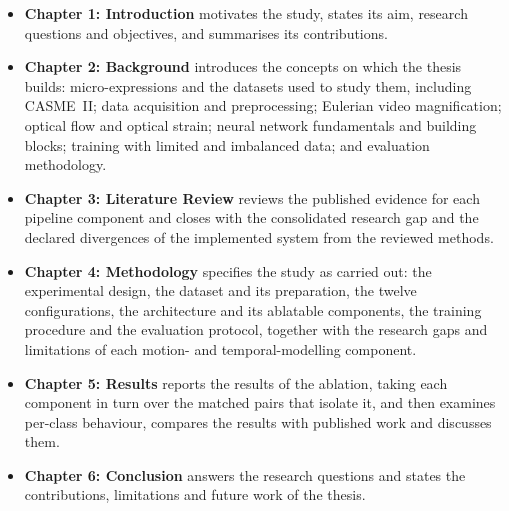 \begin{itemize}
	\item \textbf{Chapter 1: Introduction} motivates the study, states its aim, research questions and objectives, and summarises its contributions.

	\item \textbf{Chapter 2: Background} introduces the concepts on which the thesis builds: micro-expressions and the datasets used to study them, including CASME~II; data acquisition and preprocessing; Eulerian video magnification; optical flow and optical strain; neural network fundamentals and building blocks; training with limited and imbalanced data; and evaluation methodology.

	\item \textbf{Chapter 3: Literature Review} reviews the published evidence for each pipeline component and closes with the consolidated research gap and the declared divergences of the implemented system from the reviewed methods.

	\item \textbf{Chapter 4: Methodology} specifies the study as carried out: the experimental design, the dataset and its preparation, the twelve configurations, the architecture and its ablatable components, the training procedure and the evaluation protocol, together with the research gaps and limitations of each motion- and temporal-modelling component.

	\item \textbf{Chapter 5: Results} reports the results of the ablation, taking each component in turn over the matched pairs that isolate it, and then examines per-class behaviour, compares the results with published work and discusses them.

	\item \textbf{Chapter 6: Conclusion} answers the research questions and states the contributions, limitations and future work of the thesis.
\end{itemize}

